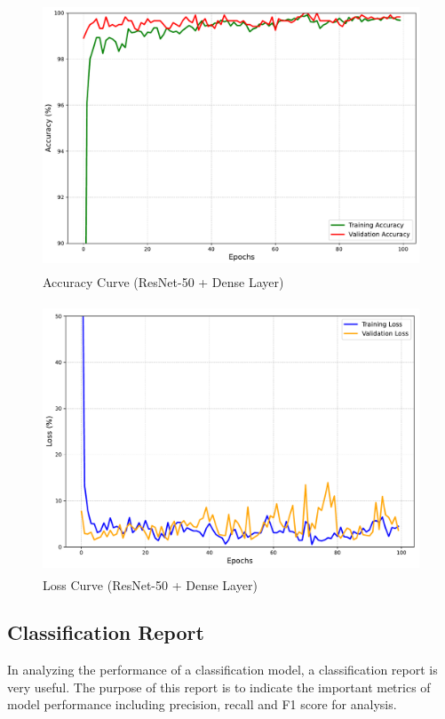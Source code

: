 \begin{figure}[H]
\centering
\includegraphics[height=8cm]{./fig/accuracy_curve.pdf} 
\centering
\caption{Accuracy Curve (ResNet-50 + Dense Layer)}
\label{Accuracy_Curve}
\end{figure}

\begin{figure}[H]
\centering
\includegraphics[height=8cm]{./fig/loss_curve.pdf} 
\centering
\caption{Loss Curve (ResNet-50 + Dense Layer)}
\label{Loss_Curve}
\end{figure}

\subsection{Classification Report}
\label{sec:sec4_3_2}
In analyzing the performance of a classification model, a classification report is very useful. The purpose of this report is to indicate the important metrics of model performance including precision, recall and F1 score for analysis.\\

